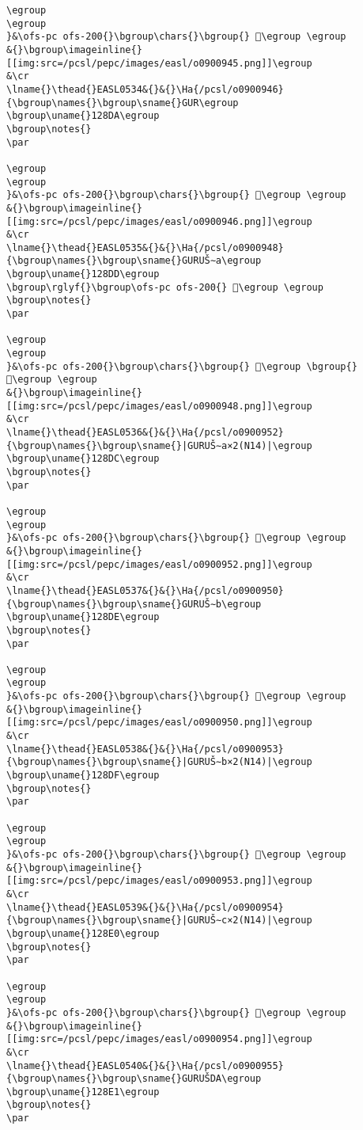 \begin{verbatim}
\egroup
\egroup
}&\ofs-pc ofs-200{}\bgroup\chars{}\bgroup{} 𒣙\egroup \egroup
&{}\bgroup\imageinline{}[[img:src=/pcsl/pepc/images/easl/o0900945.png]]\egroup
&\cr
\lname{}\thead{}EASL0534&{}&{}\Ha{/pcsl/o0900946}{\bgroup\names{}\bgroup\sname{}GUR\egroup
\bgroup\uname{}128DA\egroup
\bgroup\notes{}
\par 

\egroup
\egroup
}&\ofs-pc ofs-200{}\bgroup\chars{}\bgroup{} 𒣚\egroup \egroup
&{}\bgroup\imageinline{}[[img:src=/pcsl/pepc/images/easl/o0900946.png]]\egroup
&\cr
\lname{}\thead{}EASL0535&{}&{}\Ha{/pcsl/o0900948}{\bgroup\names{}\bgroup\sname{}GURUŠ∼a\egroup
\bgroup\uname{}128DD\egroup
\bgroup\rglyf{}\bgroup\ofs-pc ofs-200{} 𒣝\egroup \egroup
\bgroup\notes{}
\par 

\egroup
\egroup
}&\ofs-pc ofs-200{}\bgroup\chars{}\bgroup{} 𒣛\egroup \bgroup{} 𒣝\egroup \egroup
&{}\bgroup\imageinline{}[[img:src=/pcsl/pepc/images/easl/o0900948.png]]\egroup
&\cr
\lname{}\thead{}EASL0536&{}&{}\Ha{/pcsl/o0900952}{\bgroup\names{}\bgroup\sname{}|GURUŠ∼a×2(N14)|\egroup
\bgroup\uname{}128DC\egroup
\bgroup\notes{}
\par 

\egroup
\egroup
}&\ofs-pc ofs-200{}\bgroup\chars{}\bgroup{} 𒣜\egroup \egroup
&{}\bgroup\imageinline{}[[img:src=/pcsl/pepc/images/easl/o0900952.png]]\egroup
&\cr
\lname{}\thead{}EASL0537&{}&{}\Ha{/pcsl/o0900950}{\bgroup\names{}\bgroup\sname{}GURUŠ∼b\egroup
\bgroup\uname{}128DE\egroup
\bgroup\notes{}
\par 

\egroup
\egroup
}&\ofs-pc ofs-200{}\bgroup\chars{}\bgroup{} 𒣞\egroup \egroup
&{}\bgroup\imageinline{}[[img:src=/pcsl/pepc/images/easl/o0900950.png]]\egroup
&\cr
\lname{}\thead{}EASL0538&{}&{}\Ha{/pcsl/o0900953}{\bgroup\names{}\bgroup\sname{}|GURUŠ∼b×2(N14)|\egroup
\bgroup\uname{}128DF\egroup
\bgroup\notes{}
\par 

\egroup
\egroup
}&\ofs-pc ofs-200{}\bgroup\chars{}\bgroup{} 𒣟\egroup \egroup
&{}\bgroup\imageinline{}[[img:src=/pcsl/pepc/images/easl/o0900953.png]]\egroup
&\cr
\lname{}\thead{}EASL0539&{}&{}\Ha{/pcsl/o0900954}{\bgroup\names{}\bgroup\sname{}|GURUŠ∼c×2(N14)|\egroup
\bgroup\uname{}128E0\egroup
\bgroup\notes{}
\par 

\egroup
\egroup
}&\ofs-pc ofs-200{}\bgroup\chars{}\bgroup{} 𒣠\egroup \egroup
&{}\bgroup\imageinline{}[[img:src=/pcsl/pepc/images/easl/o0900954.png]]\egroup
&\cr
\lname{}\thead{}EASL0540&{}&{}\Ha{/pcsl/o0900955}{\bgroup\names{}\bgroup\sname{}GURUŠDA\egroup
\bgroup\uname{}128E1\egroup
\bgroup\notes{}
\par 


\end{verbatim}
